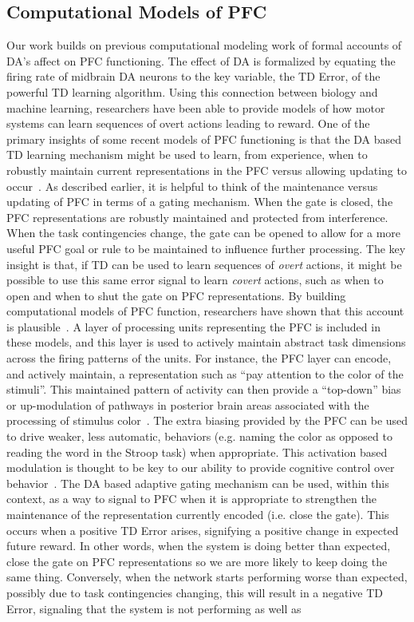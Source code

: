 \documentclass[man]{apa}
\begin{document}
\bigskip

\subsection{Computational Models of PFC}
Our work builds on previous computational modeling work of formal accounts of DA's affect on PFC functioning.  The effect of DA is formalized by equating the firing rate of midbrain DA neurons to the key variable, the TD Error, of the powerful TD learning algorithm.  Using this connection between biology and machine learning, researchers have been able to provide models of how motor systems can learn sequences of overt actions leading to reward.  One of the primary insights of some recent models of PFC functioning is that the DA based TD learning mechanism might be used to learn, from experience, when to robustly maintain current representations in the PFC versus allowing updating to occur~\cite{BraverTS:2000:Control}.  As described earlier, it is helpful to think of the maintenance versus updating of PFC in terms of a gating mechanism.  When the gate is closed, the PFC representations are robustly maintained and protected from interference.  When the task contingencies change, the gate can be opened to allow for a more useful PFC goal or rule to be maintained to influence further processing.  The key insight is that, if TD can be used to learn sequences of \emph{overt} actions, it might be possible to use this same error signal to learn \emph{covert} actions, such as when to open and when to shut the gate on PFC representations.  By building computational models of PFC function, researchers have shown that this account is plausible~\cite{BraverTS:2000:Control,OReillyRC:2002:IDED}.  A layer of processing units representing  the PFC is included in these models, and this layer is used to actively maintain abstract task dimensions across the firing patterns of the units.  For instance, the PFC layer can encode, and actively maintain, a representation such as ``pay attention to the color of the stimuli''.  This maintained pattern of activity can then provide a ``top-down'' bias or up-modulation of pathways in posterior brain areas associated with the processing of stimulus color~\cite{CohenJD:1990:Stroop}.  The extra biasing provided by the PFC can be used to drive weaker, less automatic, behaviors (e.g. naming the color as opposed to reading the word in the Stroop task) when appropriate.  This activation based modulation is thought to be key to our ability to provide cognitive control over behavior~\cite{CohenJD:1992:Schizophrenia}.  The DA based adaptive gating mechanism can be used, within this context, as a way to signal to PFC when it is appropriate to strengthen the maintenance of the representation currently encoded (i.e. close the gate).  This occurs when a positive TD Error arises, signifying a positive change in expected future reward.  In other words, when the system is doing better than expected, close the gate on PFC representations so we are more likely to keep doing the same thing.  Conversely, when the network starts performing worse than expected, possibly due to task contingencies changing, this will result in a negative TD Error, signaling that the system is not performing as well as 
\end{document}

